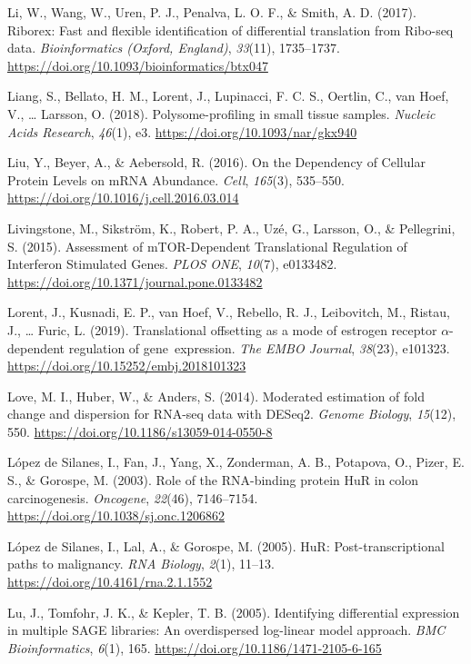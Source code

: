 \documentclass[12pt,openany]{book}
\begin{document}
\hypertarget{ref-Li2017}{}
Li, W., Wang, W., Uren, P. J., Penalva, L. O. F., \& Smith, A. D.
(2017). Riborex: Fast and flexible identification of differential
translation from Ribo-seq data. \emph{Bioinformatics (Oxford, England)},
\emph{33}(11), 1735--1737.
\url{https://doi.org/10.1093/bioinformatics/btx047}

\hypertarget{ref-Liang2018}{}
Liang, S., Bellato, H. M., Lorent, J., Lupinacci, F. C. S., Oertlin, C.,
van Hoef, V., \ldots{} Larsson, O. (2018). Polysome-profiling in small
tissue samples. \emph{Nucleic Acids Research}, \emph{46}(1), e3.
\url{https://doi.org/10.1093/nar/gkx940}

\hypertarget{ref-Liu2016}{}
Liu, Y., Beyer, A., \& Aebersold, R. (2016). On the Dependency of
Cellular Protein Levels on mRNA Abundance. \emph{Cell}, \emph{165}(3),
535--550. \url{https://doi.org/10.1016/j.cell.2016.03.014}

\hypertarget{ref-Livingstone2015}{}
Livingstone, M., Sikström, K., Robert, P. A., Uzé, G., Larsson, O., \&
Pellegrini, S. (2015). Assessment of mTOR-Dependent Translational
Regulation of Interferon Stimulated Genes. \emph{PLOS ONE},
\emph{10}(7), e0133482.
\url{https://doi.org/10.1371/journal.pone.0133482}

\hypertarget{ref-Lorent2019}{}
Lorent, J., Kusnadi, E. P., van Hoef, V., Rebello, R. J., Leibovitch,
M., Ristau, J., \ldots{} Furic, L. (2019). Translational offsetting as a
mode of estrogen receptor \(\alpha\)-dependent regulation of
gene~expression. \emph{The EMBO Journal}, \emph{38}(23), e101323.
\url{https://doi.org/10.15252/embj.2018101323}

\hypertarget{ref-Love2014}{}
Love, M. I., Huber, W., \& Anders, S. (2014). Moderated estimation of
fold change and dispersion for RNA-seq data with DESeq2. \emph{Genome
Biology}, \emph{15}(12), 550.
\url{https://doi.org/10.1186/s13059-014-0550-8}

\hypertarget{ref-LopezdeSilanes2003}{}
López de Silanes, I., Fan, J., Yang, X., Zonderman, A. B., Potapova, O.,
Pizer, E. S., \& Gorospe, M. (2003). Role of the RNA-binding protein HuR
in colon carcinogenesis. \emph{Oncogene}, \emph{22}(46), 7146--7154.
\url{https://doi.org/10.1038/sj.onc.1206862}

\hypertarget{ref-LopezdeSilanes2005}{}
López de Silanes, I., Lal, A., \& Gorospe, M. (2005). HuR:
Post-transcriptional paths to malignancy. \emph{RNA Biology},
\emph{2}(1), 11--13. \url{https://doi.org/10.4161/rna.2.1.1552}

\hypertarget{ref-Lu2005}{}
Lu, J., Tomfohr, J. K., \& Kepler, T. B. (2005). Identifying
differential expression in multiple SAGE libraries: An overdispersed
log-linear model approach. \emph{BMC Bioinformatics}, \emph{6}(1), 165.
\url{https://doi.org/10.1186/1471-2105-6-165}
\end{document}
